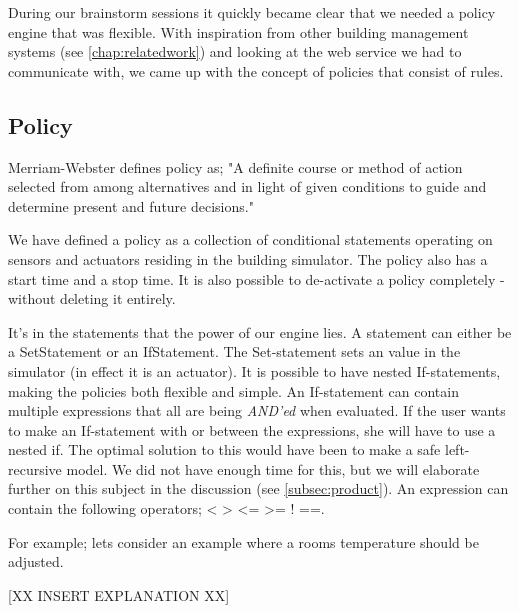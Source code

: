 
During our brainstorm sessions it quickly became clear that we needed a policy engine that was flexible. With inspiration from other building management systems (see \ref{chap:relatedwork}) and looking at the web service we had to communicate with, we came up with the concept of policies that consist of rules.

\subsection{Policy}
Merriam-Webster defines policy as; "A definite course or method of action selected from among alternatives and in light of given conditions to guide and determine present and future decisions."

We have defined a policy as a collection of conditional statements operating on sensors and actuators residing in the building simulator. The policy also has a start time and a stop time. It is also possible to de-activate a policy completely - without deleting it entirely.

It's in the statements that the power of our engine lies. A statement can either be a SetStatement or an IfStatement. The Set-statement sets an value in the simulator (in effect it is an actuator). It is possible to have nested If-statements, making the policies both flexible and simple. An If-statement can contain multiple expressions that all are being \textit{AND'ed} when evaluated. If the user wants to make an If-statement with or between the expressions, she will have to use a nested if. The optimal solution to this would have been to make a safe left-recursive model. We did not have enough time for this, but we will elaborate further on this subject in the discussion (see \ref{subsec:product}). An expression can contain the following operators; < > <= >= ! ==. 

For example; lets consider an example where a rooms temperature should be adjusted.

[XX INSERT EXPLANATION XX]

